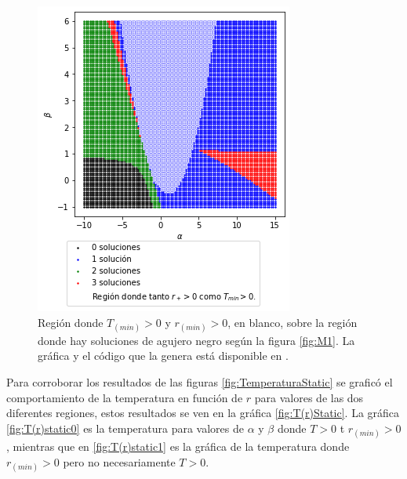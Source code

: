 \begin{figure}[H]
   \centering
    \includegraphics[scale = 0.5]{SoluciónEstática/Termodinámica/Temperatura_alphaBeta.png}
    \caption{Región donde $T_{(min)}>0$ y $r_{(min)}>0$, en blanco, sobre la región donde hay soluciones de agujero negro según la figura \ref{fig:M1}. La gráfica y el código que la genera está disponible en \cite{GitHub}.}
    \label{fig:StaticTempAlphayBeta}
\end{figure}

Para corroborar los resultados de las figuras \ref{fig:TemperaturaStatic} se graficó el comportamiento de la temperatura en función de $r$ para valores de las dos diferentes regiones, estos resultados se ven en la gráfica \ref{fig:T(r)Static}. La gráfica \ref{fig:T(r)static0} es la temperatura para valores de $\alpha$ y $\beta$ donde $T>0$ t $r_{(min)}>0$, mientras que en \ref{fig:T(r)static1} es la gráfica de la temperatura donde $r_{(min)}>0$ pero no necesariamente $T>0$.


